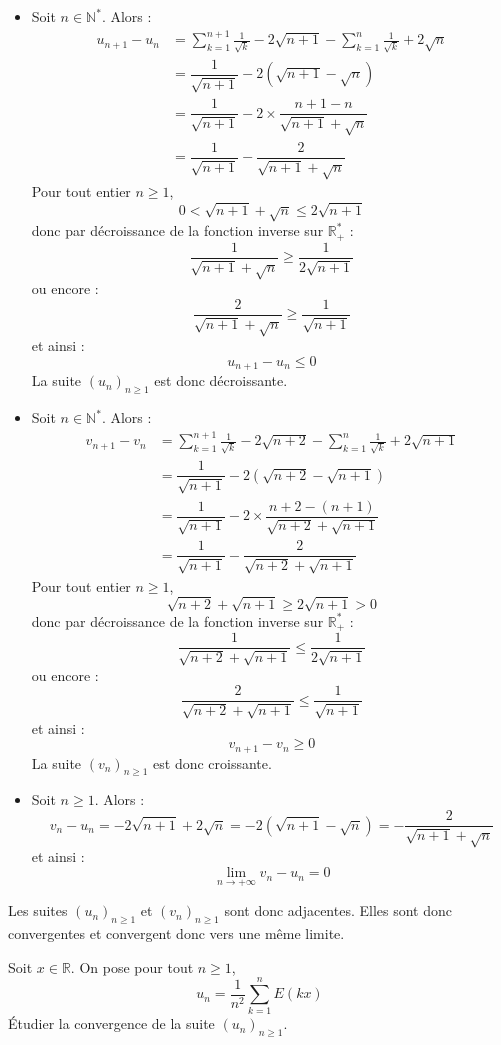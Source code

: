\documentclass[a4paper,twoside,french,10pt]{VcCours}
\begin{document}
\begin{itemize}
\item Soit $n \in \mathbb{N}^*$. Alors :
\begin{align*}
u_{n+1}-u_n & =  \sum_{k = 1}^{n+1} {\frac{1}{\sqrt k}} - 2\sqrt{n+1}  -\sum_{k = 1}^n {\frac{1}{\sqrt k}} + 2\sqrt{n}  \\
& = \dfrac{1}{\sqrt{n+1}} - 2 (\sqrt{n+1}-\sqrt{n}) \\
& = \dfrac{1}{\sqrt{n+1}} - 2 \times \dfrac{n+1-n}{\sqrt{n+1}+ \sqrt{n}} \\
& = \dfrac{1}{\sqrt{n+1}} - \dfrac{2}{\sqrt{n+1}+ \sqrt{n}}
\end{align*}
Pour tout entier $n \geq 1$,
$$ 0< \sqrt{n+1} + \sqrt{n} \leq 2 \sqrt{n+1}$$
donc par décroissance de la fonction inverse sur $\mathbb{R}_+^{*}$ :
$$ \dfrac{1}{\sqrt{n+1}+ \sqrt{n}} \geq \dfrac{1}{2 \sqrt{n+1}}$$
ou encore :
$$ \dfrac{2}{\sqrt{n+1}+\sqrt{n}} \geq \dfrac{1}{\sqrt{n+1}}$$
et ainsi :
$$ u_{n+1}-u_n \leq 0$$
La suite $(u_n)_{n \geq 1}$ est donc décroissante.
\item Soit $n \in \mathbb{N}^*$. Alors :
\begin{align*}
v_{n+1}-v_n & =  \sum_{k = 1}^{n+1} {\frac{1}{\sqrt k}} - 2\sqrt{n+2}  -\sum_{k = 1}^n {\frac{1}{\sqrt k}} + 2\sqrt{n+1}  \\
& = \dfrac{1}{\sqrt{n+1}} - 2 (\sqrt{n+2}-\sqrt{n+1}) \\
& = \dfrac{1}{\sqrt{n+1}} - 2 \times \dfrac{n+2-(n+1)}{\sqrt{n+2}+ \sqrt{n+1}} \\
& = \dfrac{1}{\sqrt{n+1}} - \dfrac{2}{\sqrt{n+2}+ \sqrt{n+1}}
\end{align*}
Pour tout entier $n \geq 1$,
$$ \sqrt{n+2} + \sqrt{n+1} \geq 2 \sqrt{n+1} > 0$$
donc par décroissance de la fonction inverse sur $\mathbb{R}_+^{*}$ :
$$ \dfrac{1}{\sqrt{n+2}+ \sqrt{n+1}} \leq \dfrac{1}{2 \sqrt{n+1}}$$
ou encore :
$$ \dfrac{2}{\sqrt{n+2}+\sqrt{n+1}} \leq \dfrac{1}{\sqrt{n+1}}$$
et ainsi :
$$ v_{n+1}-v_n \geq 0$$
La suite $(v_n)_{n \geq 1}$ est donc croissante.
\item Soit $n \geq 1$. Alors :
$$ v_n- u_n = -2 \sqrt{n+1} + 2 \sqrt{n} = -2 (\sqrt{n+1}-\sqrt{n}) = -\dfrac{2}{\sqrt{n+1}+\sqrt{n}}$$
et ainsi :
$$ \lim_{n \rightarrow + \infty} v_n -u_n = 0$$
\end{itemize}
Les suites $(u_n)_{n \geq 1}$ et $(v_n)_{n \geq 1}$ sont donc adjacentes. Elles sont donc convergentes et convergent donc vers une même limite.
 
 \medskip
 
\begin{Exercice}{} Soit $x \in \mathbb{R}$. On pose pour tout $n \geq 1$, 
$$u_n = \frac{1}{n^2} \sum_{k=1}^n E(kx)$$
Étudier la convergence de la suite $(u_n)_{n \geq 1}$.
\end{Exercice}
\end{document}
